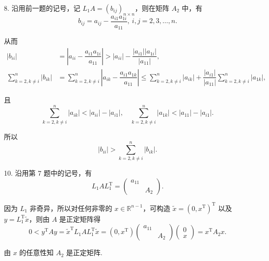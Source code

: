 \documentclass[UTF8]{ctexart}
\begin{document}
8. 沿用前一题的记号，记 $L_1A=(b_{ij})_{n\times n}$，则在矩阵 $A_2$ 中，有
\[b_{ij}=a_{ij}-\dfrac{a_{i1}a_{1i}}{a_{11}},\ i,j=2,3,\dots,n.\]

从而
\[\begin{aligned}
    |b_{ii}|&=\left|a_{ii}-\dfrac{a_{i1}a_{1i}}{a_{11}}\right|>|a_{ii}|-\dfrac{|a_{i1}||a_{1i}|}{|a_{11}|},\\
    \sum_{k=2,k\neq i}^n|b_{ik}|&=\sum_{k=2,k\neq i}^n \left|a_{ik}-\dfrac{a_{i1}a_{1k}}{a_{11}}\right|\leqslant \sum_{k=2,k\neq i}^n |a_{ik}|+\dfrac{|a_{i1}|}{|a_{11}|}\sum_{k=2,k\neq i}^n |a_{1k}|,
\end{aligned}\]

且
\[\sum_{k=2,k\neq i}^n|a_{ik}|<|a_{ii}|-|a_{i1}|,\quad \sum_{k=2,k\neq i}^n |a_{1k}|<|a_{11}|-|a_{i1}|.\]

所以
\[|b_{ii}|>\sum_{k=2,k\neq i}^n |b_{ik}|.\]

10. 沿用第 7 题中的记号，有
\[L_1AL_1^{\mathrm{T}}=\begin{pmatrix}
    a_{11}\\
    &A_2
\end{pmatrix}.\]

因为 $L_1$ 非奇异，所以对任何非零的 $x\in\mathbb{R}^{n-1}$，可构造 $\tilde{x}=(0,x^{\mathrm{T}})^{\mathrm{T}}$ 以及 $y=L_1^{\mathrm{T}}\tilde{x}$，则由 $A$ 是正定矩阵得
\[0<y^{\mathrm{T}}Ay=\tilde{x}^{\mathrm{T}}L_1AL_1^{\mathrm{T}}\tilde{x}=(0,x^{\mathrm{T}})\begin{pmatrix}
    a_{11}\\
    &A_2
\end{pmatrix}\begin{pmatrix}
    0\\x
\end{pmatrix}=x^{\mathrm{T}}A_2 x.\]

由 $x$ 的任意性知 $A_2$ 是正定矩阵.
\end{document}
